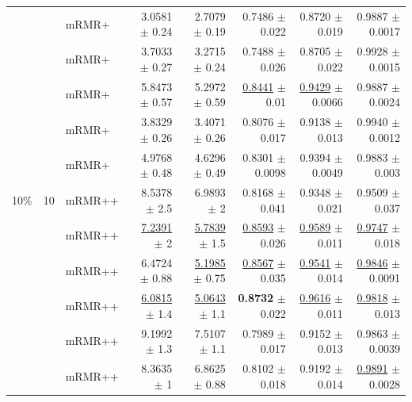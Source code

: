 \begin{longtable}{llp{}rrrrr}
 &  & mRMR+ & 3.0581 {\scriptsize $\pm$ 0.24} & 2.7079 {\scriptsize $\pm$ 0.19} & 0.7486 {\scriptsize $\pm$ 0.022} & 0.8720 {\scriptsize $\pm$ 0.019} & 0.9887 {\scriptsize $\pm$ 0.0017} \\
 &  & mRMR+ & 3.7033 {\scriptsize $\pm$ 0.27} & 3.2715 {\scriptsize $\pm$ 0.24} & 0.7488 {\scriptsize $\pm$ 0.026} & 0.8705 {\scriptsize $\pm$ 0.022} & 0.9928 {\scriptsize $\pm$ 0.0015} \\
 &  & mRMR+ & 5.8473 {\scriptsize $\pm$ 0.57} & 5.2972 {\scriptsize $\pm$ 0.59} & \underline{0.8441} {\scriptsize $\pm$ 0.01} & \underline{0.9429} {\scriptsize $\pm$ 0.0066} & 0.9887 {\scriptsize $\pm$ 0.0024} \\
 &  & mRMR+ & 3.8329 {\scriptsize $\pm$ 0.26} & 3.4071 {\scriptsize $\pm$ 0.26} & 0.8076 {\scriptsize $\pm$ 0.017} & 0.9138 {\scriptsize $\pm$ 0.013} & 0.9940 {\scriptsize $\pm$ 0.0012} \\
 &  & mRMR+ & 4.9768 {\scriptsize $\pm$ 0.48} & 4.6296 {\scriptsize $\pm$ 0.49} & 0.8301 {\scriptsize $\pm$ 0.0098} & 0.9394 {\scriptsize $\pm$ 0.0049} & 0.9883 {\scriptsize $\pm$ 0.003} \\
\midrule
10\% & 10 & mRMR++ & 8.5378 {\scriptsize $\pm$ 2.5} & 6.9893 {\scriptsize $\pm$ 2} & 0.8168 {\scriptsize $\pm$ 0.041} & 0.9348 {\scriptsize $\pm$ 0.021} & 0.9509 {\scriptsize $\pm$ 0.037} \\
 &  & mRMR++ & \underline{7.2391} {\scriptsize $\pm$ 2} & \underline{5.7839} {\scriptsize $\pm$ 1.5} & \underline{0.8593} {\scriptsize $\pm$ 0.026} & \underline{0.9589} {\scriptsize $\pm$ 0.011} & \underline{0.9747} {\scriptsize $\pm$ 0.018} \\
 &  & mRMR++ & 6.4724 {\scriptsize $\pm$ 0.88} & \underline{5.1985} {\scriptsize $\pm$ 0.75} & \underline{0.8567} {\scriptsize $\pm$ 0.035} & \underline{0.9541} {\scriptsize $\pm$ 0.014} & \underline{0.9846} {\scriptsize $\pm$ 0.0091} \\
 &  & mRMR++ & \underline{6.0815} {\scriptsize $\pm$ 1.4} & \underline{5.0643} {\scriptsize $\pm$ 1.1} & \textbf{0.8732} {\scriptsize $\pm$ 0.022} & \underline{0.9616} {\scriptsize $\pm$ 0.011} & \underline{0.9818} {\scriptsize $\pm$ 0.013} \\
 &  & mRMR++ & 9.1992 {\scriptsize $\pm$ 1.3} & 7.5107 {\scriptsize $\pm$ 1.1} & 0.7989 {\scriptsize $\pm$ 0.017} & 0.9152 {\scriptsize $\pm$ 0.013} & 0.9863 {\scriptsize $\pm$ 0.0039} \\
 &  & mRMR++ & 8.3635 {\scriptsize $\pm$ 1} & 6.8625 {\scriptsize $\pm$ 0.88} & 0.8102 {\scriptsize $\pm$ 0.018} & 0.9192 {\scriptsize $\pm$ 0.014} & \underline{0.9891} {\scriptsize $\pm$ 0.0028} \\

\end{longtable}
